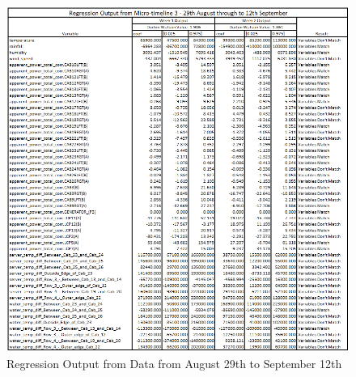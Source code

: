 \documentclass[12pt]{scrartcl}
\begin{document}
\begin{figure}[H]
  \caption{Regression Output from Data from August 29th to September 12th}
  \label{fig:regressionresultsweek3}
  \centering
    \includegraphics[scale=0.75]{regressionweek3}
\end{figure} 
\end{document}
